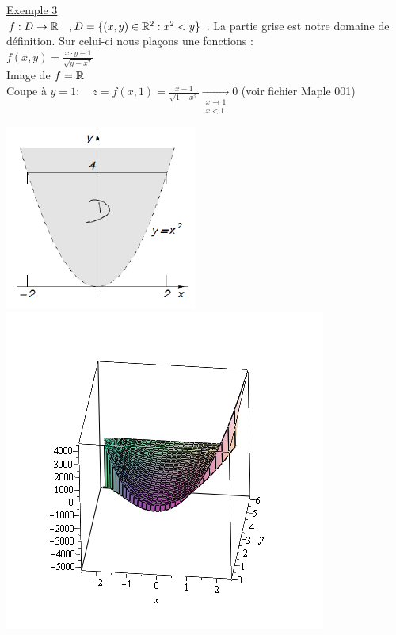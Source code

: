 \documentclass[12pt,a4paper]{article}
\begin{document}
\begin{multicols}{2}
	\underline{Exemple 3}\\
	$f : D \to \mathbb{R} \quad, D = \{(x,y) \in \mathbb{R}^2 : x^2 < y\}$ . La partie grise est notre domaine de définition. Sur celui-ci nous plaçons une fonctions :\\
	$f(x,y) = \frac{x\cdot y - 1}{\sqrt{y-x^2}}$\\
	Image de $f = \mathbb{R}$\\
	Coupe à $y = 1 : \quad z = f(x,1) = \frac{x-1}{\sqrt{1-x^2}} \underset{\substack{x\to 1 \\ x<1}}{\to} 0$ (voir fichier Maple 001)
	\columnbreak
	
	\includegraphics[scale=0.5]{images/parabole_grise}\\
	\includegraphics[scale=0.5]{images/maple001}
		\end{multicols}
\end{document}
